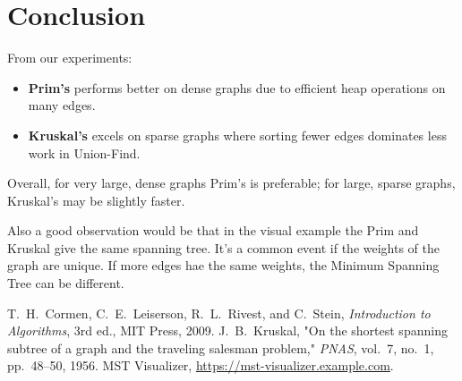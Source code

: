 \documentclass[12pt]{article}
\begin{document}
\section*{Conclusion}
From our experiments:
\begin{itemize}
  \item \textbf{Prim's} performs better on dense graphs due to efficient heap operations on many edges.
  \item \textbf{Kruskal's} excels on sparse graphs where sorting fewer edges dominates less work in Union-Find.
\end{itemize}
Overall, for very large, dense graphs Prim’s is preferable; for large, sparse graphs, Kruskal’s may be slightly faster.

Also a good observation would be that in the visual example the Prim and Kruskal give the same spanning tree.
It's a common event if the weights of the graph are unique. If more edges hae the same weights, the Minimum 
Spanning Tree can be different.

\clearpage
\begin{thebibliography}{9}
   T.~H.~Cormen, C.~E.~Leiserson, R.~L.~Rivest, and C.~Stein, \emph{Introduction to Algorithms}, 3rd ed., MIT Press, 2009.
   J.~B.~Kruskal, "On the shortest spanning subtree of a graph and the traveling salesman problem," \emph{PNAS}, vol.~7, no.~1, pp.~48--50, 1956.
   MST Visualizer, \url{https://mst-visualizer.example.com}.
\end{thebibliography}
\end{document}
